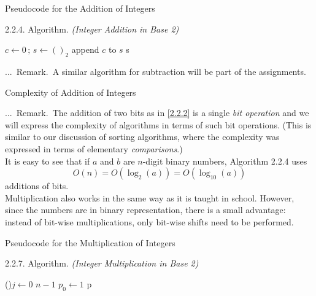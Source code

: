 \documentclass[smaller,hyperref={CJKbookmarks=true}]{beamer}
\newcounter{zhuo}[subsection]
\renewcommand{\thezhuo}{\thesection.\thesubsection.\arabic{zhuo}}
\newenvironment{REMARK}{\stepcounter{zhuo}\alert{\thezhuo.~Remark.\,}}{}
\begin{document}
\begin{frame}[t]{Pseudocode for the Addition of Integers}
\begin{spacing}{1.05}
\alert{2.2.4. Algorithm.} \emph{(Integer Addition in Base 2)}
\IncMargin{1em}
\begin{algorithm}[H]
$c\leftarrow0\,;\,s\leftarrow()_2$\;
append $c$ to $s$\;
\Return s
\end{algorithm}\DecMargin{1em}
\vspace*{5pt}
\begin{REMARK}
A similar algorithm for subtraction will be part of the assignments.
\end{REMARK}
\end{spacing}
\end{frame}
\begin{frame}[c]{Complexity of Addition of Integers}
\begin{spacing}{1.1}
\begin{REMARK}
The addition of two bits as in \eqref{2.2.2} is a single \emph{bit
operation} and we will express the complexity of algorithms in terms of
such bit operations. (This is similar to our discussion of sorting algorithms,
where the complexity was expressed in terms of elementary \emph{comparisons}.)\\[5pt]
It is easy to see that if $a$ and $b$ are $n$-digit binary numbers, Algorithm 2.2.4 uses
\[O(n)=O(\log_2(a))=O(\log_{10}(a))\]
additions of bits.\\[8pt]
Multiplication also works in the same way as it is taught in school.
However, since the numbers are in binary representation, there is a small
advantage: instead of bit-wise multiplications, only bit-wise shifts need to
be performed.
\end{REMARK}
\end{spacing}
\end{frame}
\begin{frame}[c]{Pseudocode for the Multiplication of Integers}
\begin{spacing}{1.05}
\alert{2.2.7. Algorithm.} \emph{(Integer Multiplication in Base 2)}
\IncMargin{1em}
\begin{algorithm}[H]
\For(){$j\leftarrow0$ \KwTo $n-1$}{
\;
\;}
$p_0\leftarrow1$\;
\Return p
\end{algorithm}\DecMargin{1em}
\end{spacing}
\end{frame}
\end{document}

